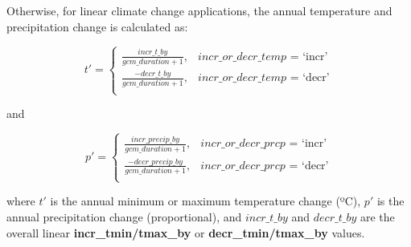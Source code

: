 \documentclass[a4paper, 12pt] {article}
\begin{document}
Otherwise, for linear climate change applications, the annual temperature and precipitation change is calculated as:

\begin{equation}
 t' = \begin{cases}
 \frac{incr\_t\_by}{gcm\_duration + 1}, & \text{$incr\_or\_decr\_temp$ = `incr'} \\
\frac{-decr\_t\_by}{gcm\_duration + 1}, & \text{$incr\_or\_decr\_temp$ = `decr'} \\
\end{cases}
\end{equation}

and 

\begin{equation}
 p' = \begin{cases}
 \frac{incr\_precip\_by}{gcm\_duration + 1}, & \text{$incr\_or\_decr\_prcp$ = `incr'} \\
\frac{-decr\_precip\_by}{gcm\_duration + 1}, & \text{$incr\_or\_decr\_prcp$ = `decr'} \\
\end{cases}
\end{equation}

where $t'$ is the annual minimum or maximum temperature change (ºC), $p'$ is the annual precipitation change (proportional), and $incr\_t\_by$ and $decr\_t\_by$ are the overall linear \textbf{incr\_tmin/tmax\_by} or \textbf{decr\_tmin/tmax\_by} values. 
\end{document}
